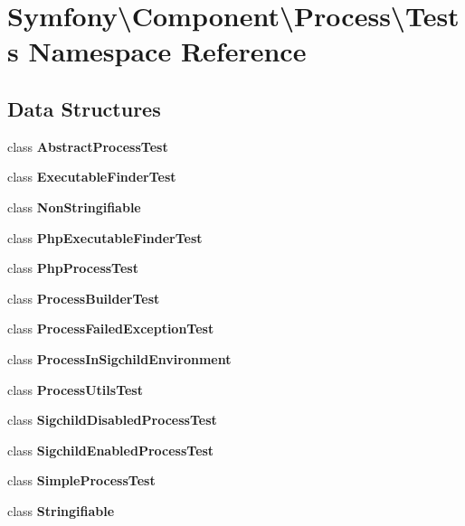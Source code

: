 \section{Symfony\textbackslash{}Component\textbackslash{}Process\textbackslash{}Tests Namespace Reference}
\label{namespace_symfony_1_1_component_1_1_process_1_1_tests}
\subsection*{Data Structures}
\begin{DoxyCompactItemize}
\item 
class {\bf Abstract\+Process\+Test}
\item 
class {\bf Executable\+Finder\+Test}
\item 
class {\bf Non\+Stringifiable}
\item 
class {\bf Php\+Executable\+Finder\+Test}
\item 
class {\bf Php\+Process\+Test}
\item 
class {\bf Process\+Builder\+Test}
\item 
class {\bf Process\+Failed\+Exception\+Test}
\item 
class {\bf Process\+In\+Sigchild\+Environment}
\item 
class {\bf Process\+Utils\+Test}
\item 
class {\bf Sigchild\+Disabled\+Process\+Test}
\item 
class {\bf Sigchild\+Enabled\+Process\+Test}
\item 
class {\bf Simple\+Process\+Test}
\item 
class {\bf Stringifiable}
\end{DoxyCompactItemize}
